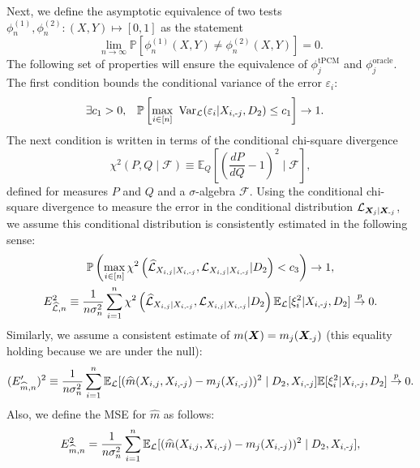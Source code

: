\documentclass[12pt]{article}
\theoremstyle{definition}
\theoremstyle{remark}
\newcommand{\E}{\mathbb E}								%
\renewcommand{\P}{\mathbb{P}}							%
\newcommand{\prx}{\bm X}								%
\newcommand{\srx}{X}									%
\newcommand{\law}{\mathcal L}							%
\newcommand{\lawhat}{\widehat{\mathcal L}}				%
\newcommand{\minus}{\textnormal{-}} 						    %
\begin{document}
Next, we define the asymptotic equivalence of two tests $\phi^{(1)}_n, \phi^{(2)}_n: (X,Y) \mapsto [0,1]$ as the statement
$$
\lim_{n\to \infty} \P[\phi_n^{(1)}(X,Y) \neq \phi_n^{(2)}(X,Y)] = 0.
$$
The following set of properties will ensure the equivalence of $\phi_j^{\text{tPCM}}$ and $\phi_{j}^{\text{oracle}}$. The first condition bounds the conditional variance of the error $\varepsilon_i$:
\begin{equation} \label{eq:var-bounded}
	\begin{aligned}
		\exists c_1 > 0, \quad & \P\left[ \max_{i \in [n]}\ \mathrm{Var}_\law(\varepsilon_i | \srx_{i,\minus j},D_2) \leq c_1 \right] \to 1.
	\end{aligned}
\end{equation}
The next condition is written in terms of the conditional chi-square divergence
\begin{equation}
\chi^2(P, Q \mid \mathcal F) \equiv \E_{Q}\left[\left(\frac{dP}{dQ}-1\right)^2\mid \mathcal F\right],
\end{equation}
defined for measures $P$ and $Q$ and a $\sigma$-algebra $\mathcal F$. Using the conditional chi-square divergence to measure the error in the conditional distribution $\law_{\prx_j \mid \prx_{\minus j}}$, we assume this conditional distribution is consistently estimated in the following sense:
\begin{gather}
	\label{eq:uniform-bound-div} \P\left( \max_{i \in [n]}\chi^2\left(\lawhat_{\srx_{i,j}|\srx_{i,\minus j}}, \law_{\srx_{i,j}|\srx_{i,\minus j}} | D_2\right) < c_3\right) \to 1,\\ 
	\label{eq:consistency-of-chi-square-div}	E^2_{\lawhat,n} \equiv \frac{1}{n\sigma_n^2} \sum_{i=1}^n \chi^2\left(\lawhat_{\srx_{i,j}|\srx_{i,\minus j}}, \law_{\srx_{i,j}|\srx_{i,\minus j}} | D_2\right) \E_\law[ \xi_i^2 | \srx_{i,\minus j}, D_2] \overset{p}{\to} 0.
\end{gather}
Similarly, we assume a consistent estimate of $m(\prx) = m_j(\prx_{\minus j})$ (this equality holding because we are under the null):
\begin{equation}\label{eq:consitency-of-reg-func}
	(E'_{\widehat m,n})^2 \equiv \frac{1}{n\sigma_n^2}\sum_{i=1}^n\E_\law[( \widehat m (\srx_{i,j},\srx_{i,\minus j}) - m_j(\srx_{i,\minus j}))^2  \mid D_2,\srx_{i,\minus j}]\E [\xi_i^2|\srx_{i,\minus j},D_2] \overset{p}{\to} 0.
\end{equation}
Also, we define the MSE for $\widehat m$ as follows:
\begin{equation*}
	E^2_{\widehat m,n} = \frac{1}{n\sigma_n^2}\sum_{i=1}^n\E_\law[( \widehat m (\srx_{i,j},\srx_{i,\minus j}) - m_j(\srx_{i,\minus j}))^2  \mid D_2,\srx_{i,\minus j}], 
\end{equation*}
\end{document}
